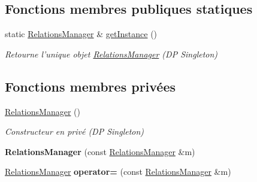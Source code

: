 \subsection*{Fonctions membres publiques statiques}
\begin{DoxyCompactItemize}
\item 
static \hyperlink{class_relations_manager}{Relations\-Manager} \& \hyperlink{class_relations_manager_adde192ed5510fc9c4e79a345c42175bc}{get\-Instance} ()
\begin{DoxyCompactList}\small\item\em Retourne l'unique objet \hyperlink{class_relations_manager}{Relations\-Manager} (D\-P Singleton) \end{DoxyCompactList}\end{DoxyCompactItemize}
\subsection*{Fonctions membres privées}
\begin{DoxyCompactItemize}
\item 
\hypertarget{class_relations_manager_a7b9f5d9cd55fa4f51c2c8203f555008a}{\hyperlink{class_relations_manager_a7b9f5d9cd55fa4f51c2c8203f555008a}{Relations\-Manager} ()}\label{class_relations_manager_a7b9f5d9cd55fa4f51c2c8203f555008a}

\begin{DoxyCompactList}\small\item\em Constructeur en privé (D\-P Singleton) \end{DoxyCompactList}\item 
\hypertarget{class_relations_manager_aab9a1490ef70148084c376f94bfca48e}{{\bfseries Relations\-Manager} (const \hyperlink{class_relations_manager}{Relations\-Manager} \&m)}\label{class_relations_manager_aab9a1490ef70148084c376f94bfca48e}

\item 
\hypertarget{class_relations_manager_a44e5d296957404b4553923c3442cfe1b}{\hyperlink{class_relations_manager}{Relations\-Manager} {\bfseries operator=} (const \hyperlink{class_relations_manager}{Relations\-Manager} \&m)}\label{class_relations_manager_a44e5d296957404b4553923c3442cfe1b}

\end{DoxyCompactItemize}
